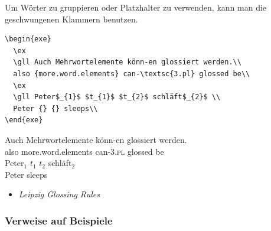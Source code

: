 \begin{frame}[fragile]


Um Wörter zu gruppieren oder Platzhalter zu verwenden, kann man die geschwungenen Klammern benutzen.

\begin{lstlisting}
\begin{exe}
  \ex
  \gll Auch Mehrwortelemente könn-en glossiert werden.\\
  also {more.word.elements} can-\textsc{3.pl} glossed be\\
  \ex 
  \gll Peter$_{1}$ $t_{1}$ $t_{2}$ schläft$_{2}$ \\
  Peter {} {} sleeps\\
\end{exe}
\end{lstlisting}



\begin{exe}
	\ex
	\gll Auch Mehrwortelemente könn-en glossiert werden.\\
	also {more.word.elements} can-\textsc{3.pl} glossed be\\
	\ex 
	\gll Peter$_{1}$ $t_{1}$ $t_{2}$ schläft$_{2}$ \\
	Peter {} {} sleeps\\
\end{exe}

\begin{itemize}
\item[\ras] \emph{Leipzig Glossing Rules} \citep[vgl.][]{LeipzigGloss15a}
\end{itemize}

\end{frame}


\subsubsection{Verweise auf Beispiele}

